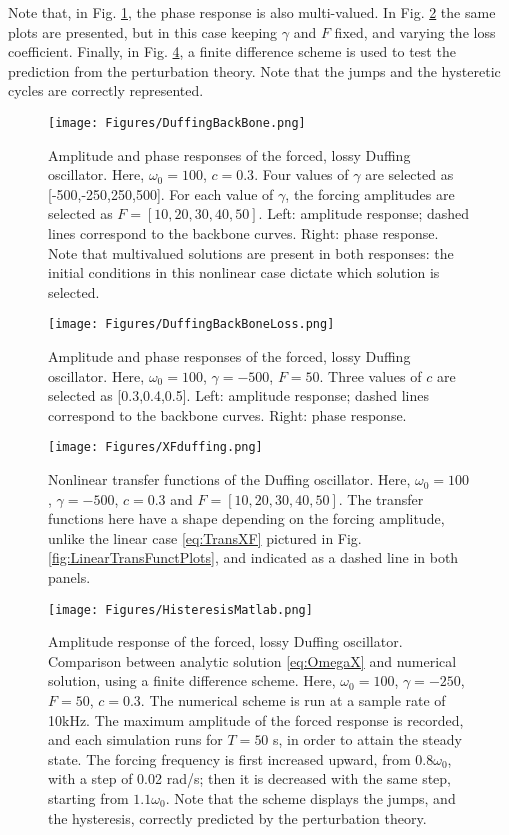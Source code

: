 \documentclass[11pt,twoside,a4paper,english]{book}
\begin{document}
Note that, in Fig. \ref{fig:DuffBckb1}, the phase response is also multi-valued. In Fig. \ref{fig:DuffBckb2} the same plots are presented, but in this case keeping $\gamma$ and $F$ fixed, and varying the loss coefficient. Finally, in Fig. \ref{fig:DuffFD}, a finite difference scheme is used to test the prediction from the perturbation theory. Note that the jumps and the hysteretic cycles are correctly represented.
\begin{figure}
\texttt{[image: Figures/DuffingBackBone.png]}
\caption{Amplitude and phase responses of the forced, lossy Duffing oscillator. Here, $\omega_0=100$, $c=0.3$. Four values of $\gamma$ are selected as [-500,-250,250,500]. For each value of $\gamma$, the forcing amplitudes are selected as $F = [10,20,30,40,50]$. Left: amplitude response; dashed lines correspond to the backbone curves. Right: phase response. Note that multivalued solutions are present in both responses: the initial conditions in this nonlinear case dictate which solution is selected.}\label{fig:DuffBckb1}
\end{figure}
\begin{figure}
\texttt{[image: Figures/DuffingBackBoneLoss.png]}
\caption{Amplitude and phase responses of the forced, lossy Duffing oscillator. Here, $\omega_0=100$, $\gamma=-500$, $F=50$. Three values of $c$ are selected as [0.3,0.4,0.5]. Left: amplitude response; dashed lines correspond to the backbone curves. Right: phase response.}\label{fig:DuffBckb2}
\end{figure}
\begin{figure}
\texttt{[image: Figures/XFduffing.png]}
\caption{Nonlinear transfer functions of the Duffing oscillator.  
Here, $\omega_0=100$, $\gamma=-500$, $c=0.3$ and $F = [10,20,30,40,50]$. The transfer functions here have a shape depending on the forcing amplitude, unlike the linear case \eqref{eq:TransXF} pictured in Fig. \ref{fig:LinearTransFunctPlots}, and indicated as a dashed line in both panels.}\label{fig:XFduffing}
\end{figure}
\begin{figure}
\texttt{[image: Figures/HisteresisMatlab.png]}
\caption{Amplitude response of the forced, lossy Duffing oscillator. Comparison between analytic solution \eqref{eq:OmegaX} and numerical solution, using a finite difference scheme.  
Here, $\omega_0=100$, $\gamma=-250$, $F=50$, $c=0.3$. The numerical scheme is run at a sample rate of 10kHz. The maximum amplitude of the forced response is recorded, and each simulation runs for $T=50$ s, in order to attain the steady state. The forcing frequency is first increased upward, from $0.8\omega_0$, with a step of 0.02 rad/s; then it is decreased with the same step, starting from $1.1\omega_0$. Note that the scheme displays the jumps, and the hysteresis, correctly predicted by the perturbation theory.}\label{fig:DuffFD}
\end{figure}
\end{document}
